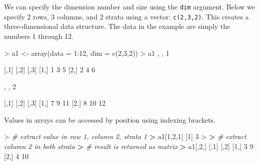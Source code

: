 \documentclass[
]{book}
\newenvironment{Shaded}{\begin{snugshade}}{\end{snugshade}}
\newcommand{\AttributeTok}[1]{\textcolor[rgb]{0.77,0.63,0.00}{#1}}
\newcommand{\CommentTok}[1]{\textcolor[rgb]{0.56,0.35,0.01}{\textit{#1}}}
\newcommand{\DecValTok}[1]{\textcolor[rgb]{0.00,0.00,0.81}{#1}}
\newcommand{\ErrorTok}[1]{\textcolor[rgb]{0.64,0.00,0.00}{\textbf{#1}}}
\newcommand{\FunctionTok}[1]{\textcolor[rgb]{0.00,0.00,0.00}{#1}}
\newcommand{\NormalTok}[1]{#1}
\newcommand{\OtherTok}[1]{\textcolor[rgb]{0.56,0.35,0.01}{#1}}
\newcommand{\SpecialCharTok}[1]{\textcolor[rgb]{0.00,0.00,0.00}{#1}}
\begin{document}
We can specify the dimension number and size using the \texttt{dim} argument. Below we specify 2 rows, 3 columns, and 2 strata using a vector: \texttt{c(2,3,2)}. This creates a three-dimensional data structure. The data in the example are simply the numbers 1 through 12.

\begin{Shaded}
\begin{Highlighting}[]
\SpecialCharTok{\textgreater{}}\NormalTok{ a1 }\OtherTok{\textless{}{-}} \FunctionTok{array}\NormalTok{(}\AttributeTok{data =} \DecValTok{1}\SpecialCharTok{:}\DecValTok{12}\NormalTok{, }\AttributeTok{dim =} \FunctionTok{c}\NormalTok{(}\DecValTok{2}\NormalTok{,}\DecValTok{3}\NormalTok{,}\DecValTok{2}\NormalTok{))}
\SpecialCharTok{\textgreater{}}\NormalTok{ a1}
\NormalTok{, , }\DecValTok{1}

\NormalTok{     [,}\DecValTok{1}\NormalTok{] [,}\DecValTok{2}\NormalTok{] [,}\DecValTok{3}\NormalTok{]}
\NormalTok{[}\DecValTok{1}\NormalTok{,]    }\DecValTok{1}    \DecValTok{3}    \DecValTok{5}
\NormalTok{[}\DecValTok{2}\NormalTok{,]    }\DecValTok{2}    \DecValTok{4}    \DecValTok{6}

\NormalTok{, , }\DecValTok{2}

\NormalTok{     [,}\DecValTok{1}\NormalTok{] [,}\DecValTok{2}\NormalTok{] [,}\DecValTok{3}\NormalTok{]}
\NormalTok{[}\DecValTok{1}\NormalTok{,]    }\DecValTok{7}    \DecValTok{9}   \DecValTok{11}
\NormalTok{[}\DecValTok{2}\NormalTok{,]    }\DecValTok{8}   \DecValTok{10}   \DecValTok{12}
\end{Highlighting}
\end{Shaded}

Values in arrays can be accessed by position using indexing brackets.

\begin{Shaded}
\begin{Highlighting}[]
\SpecialCharTok{\textgreater{}} \CommentTok{\# extract value in row 1, column 2, strata 1}
\ErrorTok{\textgreater{}}\NormalTok{ a1[}\DecValTok{1}\NormalTok{,}\DecValTok{2}\NormalTok{,}\DecValTok{1}\NormalTok{]}
\NormalTok{[}\DecValTok{1}\NormalTok{] }\DecValTok{3}
\SpecialCharTok{\textgreater{}} 
\ErrorTok{\textgreater{}} \CommentTok{\# extract column 2 in both strata}
\ErrorTok{\textgreater{}} \CommentTok{\# result is returned as matrix}
\ErrorTok{\textgreater{}}\NormalTok{ a1[,}\DecValTok{2}\NormalTok{,]}
\NormalTok{     [,}\DecValTok{1}\NormalTok{] [,}\DecValTok{2}\NormalTok{]}
\NormalTok{[}\DecValTok{1}\NormalTok{,]    }\DecValTok{3}    \DecValTok{9}
\NormalTok{[}\DecValTok{2}\NormalTok{,]    }\DecValTok{4}   \DecValTok{10}
\end{Highlighting}
\end{Shaded}
\end{document}
